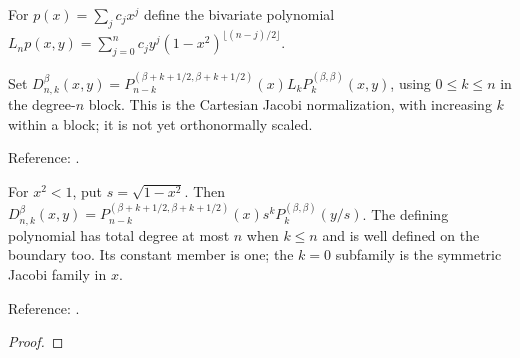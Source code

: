 \begin{supporting}
\begin{definition}
\label{def:disk-polynomial-lift}
\leanok
For $p(x)=\sum_j c_jx^j$ define the bivariate polynomial
$L_np(x,y)=\sum_{j=0}^n c_j y^j(1-x^2)^{\lfloor(n-j)/2\rfloor}$.

\end{definition}

\end{supporting}


\begin{definition}
\label{def:dunkl-xu-polynomials}
\leanok
Set $D_{n,k}^{\beta}(x,y)=P_{n-k}^{(\beta+k+1/2,\beta+k+1/2)}(x)
L_kP_k^{(\beta,\beta)}(x,y)$, using $0\le k\le n$ in the degree-$n$ block.
This is the Cartesian Jacobi normalization, with increasing $k$ within a block;
it is not yet orthonormally scaled.

Reference: \cite[Section 2.3]{dunkl-xu}.
\end{definition}

\begin{theorem}
\label{thm:dunkl-xu-separated}
\leanok
For $x^2<1$, put $s=\sqrt{1-x^2}$. Then
$D_{n,k}^{\beta}(x,y)=P_{n-k}^{(\beta+k+1/2,\beta+k+1/2)}(x)s^kP_k^{(\beta,\beta)}(y/s)$.
The defining polynomial has total degree at most $n$ when $k\le n$ and is
well defined on the boundary too. Its constant member is one; the $k=0$
subfamily is the symmetric Jacobi family in $x$.

Reference: \cite[Section 2.3]{dunkl-xu}.
\end{theorem}
\begin{proof}
\leanok
\end{proof}

